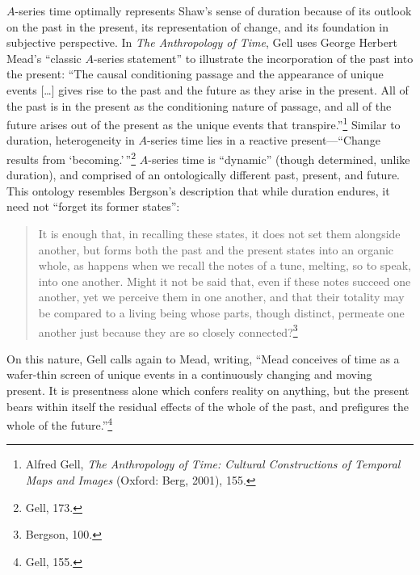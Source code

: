$A$-series time optimally represents Shaw's sense of duration because of
its outlook on the past in the present, its representation of change,
and its foundation in subjective perspective. In \emph{The Anthropology
of Time}, Gell uses George Herbert Mead's ``classic $A$-series statement''
to illustrate the incorporation of the past into the present: ``The
causal conditioning passage and the appearance of unique events
{[}\ldots{]} gives rise to the past and the future as they arise in the
present. All of the past is in the present as the conditioning nature of
passage, and all of the future arises out of the present as the unique
events that transpire.''\footnote{Alfred Gell, \emph{The Anthropology of
  Time: Cultural Constructions of Temporal Maps and Images} (Oxford:
  Berg, 2001), 155.} Similar to duration, heterogeneity in $A$-series time
lies in a reactive present---``Change results from
`becoming.'\,''\footnote{Gell, 173.} $A$-series time is ``dynamic''
(though determined, unlike duration), and comprised of an ontologically
different past, present, and future. This ontology resembles Bergson's
description that while duration endures, it need not ``forget its former
states'':
\begin{quote}
It is enough that, in recalling these states, it does not set them
alongside another, but forms both the past and the present states into
an organic whole, as happens when we recall the notes of a tune,
melting, so to speak, into one another. Might it not be said that, even
if these notes succeed one another, yet we perceive them in one another,
and that their totality may be compared to a living being whose parts,
though distinct, permeate one another just because they are so closely
connected?\footnote{Bergson, 100.}
\end{quote}
On this nature, Gell calls again to Mead, writing, ``Mead conceives of
time as a wafer-thin screen of unique events in a continuously changing
and moving present. It is presentness alone which confers reality on
anything, but the present bears within itself the residual effects of
the whole of the past, and prefigures the whole of the
future.''\footnote{Gell, 155.}

